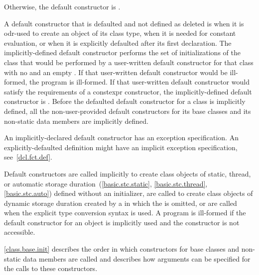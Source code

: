 Otherwise, the default constructor is
.

\pnum
A default constructor
that is defaulted and not defined as deleted
is
when it is odr-used
to create an object of its class type,
when it is needed for constant evaluation, or
when it is explicitly defaulted after its first declaration.
The implicitly-defined default constructor performs the set of
initializations of the class that would be performed by a user-written default
constructor for that class with no
 and an empty
.
If that user-written default constructor would be ill-formed,
the program is ill-formed.
If that user-written default constructor would satisfy the requirements
of a constexpr constructor, the implicitly-defined
default constructor is .
Before the defaulted default constructor for a class is
implicitly defined,
all the non-user-provided default constructors for its base classes and
its non-static data members are implicitly defined.
\begin{note}
An implicitly-declared default constructor has an
exception specification.
An explicitly-defaulted definition might have an
implicit exception specification, see~\ref{dcl.fct.def}.
\end{note}

\pnum
{}%
Default constructors are called implicitly to create class objects of static, thread,
or automatic storage duration~(\ref{basic.stc.static}, \ref{basic.stc.thread}, \ref{basic.stc.auto}) defined
without an initializer,
are called to create class objects of dynamic storage duration created by a
in which the
is omitted, or
are called when the explicit type conversion syntax is
used.
A program is ill-formed if the default constructor for an object
is implicitly used and the constructor is not accessible.

\pnum
\begin{note}
%
%
\ref{class.base.init} describes the order in which constructors for base
classes and non-static data members are called and
describes how arguments can be specified for the calls to these constructors.
\end{note}

